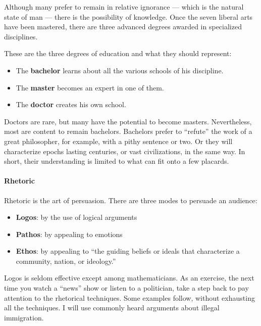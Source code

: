 Although many prefer to remain in relative ignorance --- which is the natural state of man --- there is the possibility of knowledge. Once the seven liberal arts have been mastered, there are three advanced degrees awarded in specialized disciplines.

These are the three degrees of education and what they should represent:

\begin{itemize}


\item The \textbf{bachelor} learns about all the various schools of his discipline.

\item The \textbf{master} becomes an expert in one of them.

\item The \textbf{doctor} creates his own school.
\end{itemize}


Doctors are rare, but many have the potential to become masters. Nevertheless, most are content to remain bachelors. Bachelors prefer to ``refute'' the work of a great philosopher, for example, with a pithy sentence or two. Or they will characterize epochs lasting centuries, or vast civilizations, in the same way. In short, their understanding is limited to what can fit onto a few placards.

\paragraph{Rhetoric}


Rhetoric is the art of persuasion. There are three modes to persuade an audience:

\begin{itemize}


\item \textbf{Logos}: by the use of logical arguments


\item \textbf{Pathos}: by appealing to emotions


\item \textbf{Ethos}: by appealing to ``the guiding beliefs or ideals that characterize a community, nation, or ideology.''
\end{itemize}


Logos is seldom effective except among mathematicians. As an exercise, the next time you watch a ``news'' show or listen to a politician, take a step back to pay attention to the rhetorical techniques. Some examples follow, without exhausting all the techniques. I will use commonly heard arguments about illegal immigration.

